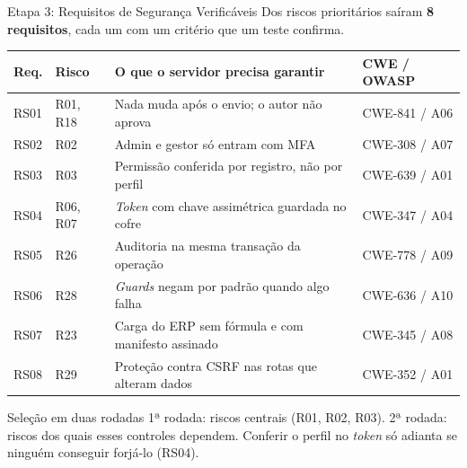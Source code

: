 \documentclass{beamer}
\begin{document}
\begin{frame}{Etapa 3: Requisitos de Segurança Verificáveis}
    \small
    Dos riscos prioritários saíram \textbf{8 requisitos}, cada um com um critério que um teste confirma.

    \vspace{0.1cm}
    \scriptsize
    \renewcommand{\arraystretch}{1.1}
    \setlength{\tabcolsep}{3pt}
    \begin{tabular}{@{}l l >{\raggedright\arraybackslash}p{6.2cm} l@{}}
        \toprule
        \textbf{Req.} & \textbf{Risco} & \textbf{O que o servidor precisa garantir} & \textbf{CWE / OWASP} \\
        \midrule
        RS01 & R01, R18 & Nada muda após o envio; o autor não aprova & CWE-841 / A06 \\
        RS02 & R02 & Admin e gestor só entram com MFA & CWE-308 / A07 \\
        RS03 & R03 & Permissão conferida por registro, não por perfil & CWE-639 / A01 \\
        RS04 & R06, R07 & \textit{Token} com chave assimétrica guardada no cofre & CWE-347 / A04 \\
        RS05 & R26 & Auditoria na mesma transação da operação & CWE-778 / A09 \\
        RS06 & R28 & \textit{Guards} negam por padrão quando algo falha & CWE-636 / A10 \\
        RS07 & R23 & Carga do ERP sem fórmula e com manifesto assinado & CWE-345 / A08 \\
        RS08 & R29 & Proteção contra CSRF nas rotas que alteram dados & CWE-352 / A01 \\
        \bottomrule
    \end{tabular}

    \vspace{0.2cm}
    \begin{exampleblock}{Seleção em duas rodadas}
        \scriptsize
        1ª rodada: riscos centrais (R01, R02, R03). 2ª rodada: riscos dos quais esses controles dependem. Conferir o perfil no \textit{token} só adianta se ninguém conseguir forjá-lo (RS04).
    \end{exampleblock}
\end{frame}
\end{document}
